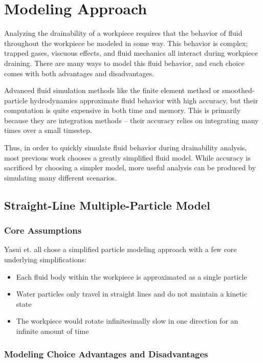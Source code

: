 						\chapter{Modeling Approach}

Analyzing the drainability of a workpiece requires that the behavior of fluid throughout the workpiece be modeled in some way. This behavior is complex; trapped gases, viscuous effects, and fluid mechanics all interact during workpiece draining. There are many ways to model this fluid behavior, and each choice comes with both advantages and disadvantages.

Advanced fluid simulation methods like the finite element method or smoothed-particle hydrodynamics approximate fluid behavior with high accuracy, but their computation is quite expensive in both time and memory. This is primarily because they are integration methods -- their accuracy relies on integrating many times over a small timestep.

Thus, in order to quickly simulate fluid behavior during drainability analysis, most previous work chooses a greatly simplified fluid model. While accuracy is sacrificed by choosing a simpler model, more useful analysis can be produced by simulating many different scenarios.

\section{Straight-Line Multiple-Particle Model}

	\subsection{Core Assumptions}

Yasui et. all \cite{plot} chose a simplified particle modeling approach with a few core underlying simplifications:

\begin{itemize}
	\item Each fluid body within the workpiece is approximated as a single particle
	\item Water particles only travel in straight lines and do not maintain a kinetic state
	\item The workpiece would rotate infinitesimally slow in one direction for an infinite amount of time
\end{itemize}

	\subsection{Modeling Choice Advantages and Disadvantages}

